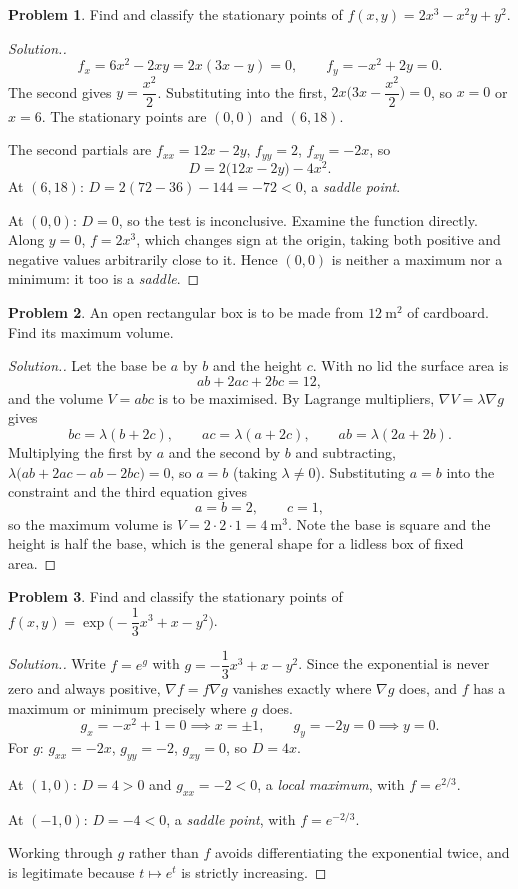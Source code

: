 \documentclass[11pt,a4paper]{article}
\theoremstyle{definition}
\newtheorem{problemx}{Problem}[subsection]
\newenvironment{problem}{\begin{problemx}}{\end{problemx}}
\newenvironment{solution}
  {\renewcommand{\qedsymbol}{}\begin{proof}[\textit{Solution}.]}
  {\end{proof}}
\begin{document}
\begin{problem}
Find and classify the stationary points of $f(x,y) = 2x^3-x^2y+y^2$.
\end{problem}
\begin{solution}
$$f_x = 6x^2-2xy = 2x(3x-y) = 0,\qquad f_y = -x^2+2y = 0 .$$
The second gives $y = \dfrac{x^2}{2}$. Substituting into the first,
$2x\Big(3x-\dfrac{x^2}{2}\Big) = 0$, so $x = 0$ or $x = 6$. The stationary
points are $(0,0)$ and $(6,18)$.

The second partials are $f_{xx} = 12x-2y$, $f_{yy} = 2$, $f_{xy} = -2x$, so
$$D = 2\big(12x-2y\big) - 4x^2 .$$
At $(6,18)$: $D = 2(72-36)-144 = -72 < 0$, a \emph{saddle point}.

At $(0,0)$: $D = 0$, so the test is inconclusive. Examine the function directly.
Along $y=0$, $f = 2x^3$, which changes sign at the origin, taking both positive
and negative values arbitrarily close to it. Hence $(0,0)$ is neither a maximum
nor a minimum: it too is a \emph{saddle}.
\end{solution}

\begin{problem}
An open rectangular box is to be made from $12\ \text{m}^2$ of cardboard. Find
its maximum volume.
\end{problem}
\begin{solution}
Let the base be $a$ by $b$ and the height $c$. With no lid the surface area is
$$ab + 2ac + 2bc = 12 ,$$
and the volume $V = abc$ is to be maximised. By Lagrange multipliers,
$\nabla V = \lambda\nabla g$ gives
$$bc = \lambda(b+2c),\qquad ac = \lambda(a+2c),\qquad ab = \lambda(2a+2b).$$
Multiplying the first by $a$ and the second by $b$ and subtracting,
$\lambda\big(ab+2ac-ab-2bc\big) = 0$, so $a = b$ (taking $\lambda\neq 0$).
Substituting $a=b$ into the constraint and the third equation gives
$$a = b = 2,\qquad c = 1 ,$$
so the maximum volume is $V = 2\cdot 2\cdot 1 = 4\ \text{m}^3$. Note the base is
square and the height is half the base, which is the general shape for a lidless
box of fixed area.
\end{solution}

\begin{problem}
Find and classify the stationary points of
$f(x,y) = \exp\Big(-\dfrac13x^3 + x - y^2\Big)$.
\end{problem}
\begin{solution}
Write $f = e^{g}$ with $g = -\dfrac13x^3+x-y^2$. Since the exponential is never
zero and always positive, $\nabla f = f\nabla g$ vanishes exactly where
$\nabla g$ does, and $f$ has a maximum or minimum precisely where $g$ does.
$$g_x = -x^2+1 = 0 \implies x = \pm 1,\qquad g_y = -2y = 0 \implies y = 0 .$$
For $g$: $g_{xx} = -2x$, $g_{yy} = -2$, $g_{xy} = 0$, so $D = 4x$.

At $(1,0)$: $D = 4>0$ and $g_{xx} = -2<0$, a \emph{local maximum}, with
$f = e^{2/3}$.

At $(-1,0)$: $D = -4<0$, a \emph{saddle point}, with $f = e^{-2/3}$.

Working through $g$ rather than $f$ avoids differentiating the exponential
twice, and is legitimate because $t\mapsto e^t$ is strictly increasing.
\end{solution}
\end{document}
